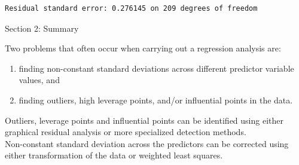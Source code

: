{{{\begin{verbatim}
Residual standard error: 0.276145 on 209 degrees of freedom
\end{verbatim}
}
\clearpage
\begin{figure}
\end{figure}
\clearpage
\newpage
\markboth{}{}
\begin{center}
Section 2: Summary
\end{center}
\vspace{0.5in}
Two problems that often occur when carrying out
a regression analysis are:
\vspace{0.15in}
\begin{enumerate}
\item finding non-constant standard deviations 
across different predictor variable values, and
\vspace{0.15in}
\item finding outliers, high leverage points, and/or influential
points in the data.
\end{enumerate}
\vspace{0.5in}
Outliers, leverage points and influential points can be identified 
using either graphical residual analysis or more specialized detection 
methods. \\
\vspace{0.5in}
Non-constant standard deviation across the predictors can be 
corrected using either transformation of the data or weighted least
squares.
\vspace{0.5in}

}
}

